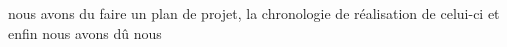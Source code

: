 \documentclass[a4paper, 11pt, french]{report}
\begin{document}
                                                                                                                                 nous
                                                                                                                                 avons
                                                                                                                                 du
                                                                                                                                 faire
                                                                                                                                 un
                                                                                                                                 plan
                                                                                                                                 de
                                                                                                                                 projet,
                                                                                                                                 la
                                                                                                                                 chronologie
                                                                                                                                 de
                                                                                                                                 réalisation
                                                                                                                                 de
                                                                                                                                 celui-ci
                                                                                                                                 et
                                                                                                                                 enfin
                                                                                                                                 nous
                                                                                                                                 avons
                                                                                                                                 dû
                                                                                                                                 nous
\end{document}
